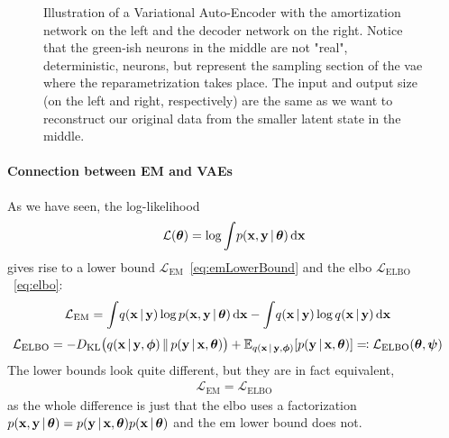 	\begin{figure}
		\centering
		\tikzVariationalAutoEncoder
		\caption{Illustration of a Variational Auto-Encoder with the amortization network on the left and the decoder network on the right. Notice that the green-ish neurons in the middle are not "real", deterministic, neurons, but represent the sampling section of the \ac{vae} where the reparametrization takes place. The input and output size (on the left and right, respectively) are the same as we want to reconstruct our original data from the smaller latent state in the middle.}
		\label{fig:vae}
	\end{figure}

	\paragraph{Connection between EM and VAEs}
		As we have seen, the log-likelihood
		\begin{align*}
			\mathcal{L}(\boldsymbol{\mathrm{\theta}}) = \log \int\! p(\boldsymbol{\mathrm{x}}, \boldsymbol{\mathrm{y}} \,\vert\, \boldsymbol{\mathrm{\theta}}) \dd{\boldsymbol{\mathrm{x}}}
		\end{align*}
		gives rise to a lower bound \( \mathcal{L}_\mathrm{EM} \)~\eqref{eq:emLowerBound} and the \ac{elbo} \( \mathcal{L}_\mathrm{ELBO} \)~\eqref{eq:elbo}:
		\begin{align*}
			\mathcal{L}_\mathrm{EM}
				&= \int\! q(\boldsymbol{\mathrm{x}} \,\vert\, \boldsymbol{\mathrm{y}}) \log p(\boldsymbol{\mathrm{x}}, \boldsymbol{\mathrm{y}} \,\vert\, \boldsymbol{\mathrm{\theta}}) \dd{\boldsymbol{\mathrm{x}}} - \int\! q(\boldsymbol{\mathrm{x}} \,\vert\, \boldsymbol{\mathrm{y}}) \log q(\boldsymbol{\mathrm{x}} \,\vert\, \boldsymbol{\mathrm{y}}) \dd{\boldsymbol{\mathrm{x}}}
		\end{align*}
		\begin{align*}
			\mathcal{L}_\mathrm{ELBO}
				&= -D_\mathrm{KL}\big( q(\boldsymbol{\mathrm{x}} \,\vert\, \boldsymbol{\mathrm{y}}, \boldsymbol{\mathrm{\phi}}) \,\Vert\, p(\boldsymbol{\mathrm{y}} \,\vert\, \boldsymbol{\mathrm{x}}, \boldsymbol{\mathrm{\theta}}) \big) + \mathbb{E}_{q(\boldsymbol{\mathrm{x}} \,\vert\, \boldsymbol{\mathrm{y}}, \boldsymbol{\mathrm{\phi}})}[p(\boldsymbol{\mathrm{y}} \,\vert\, \boldsymbol{\mathrm{x}}, \boldsymbol{\mathrm{\theta}})] \eqqcolon \mathcal{L}_\mathrm{ELBO}(\boldsymbol{\mathrm{\theta}}, \boldsymbol{\mathrm{\psi}})
		\end{align*}
		The lower bounds look quite different, but they are in fact equivalent,
		\begin{align*}
			\mathcal{L}_\mathrm{EM} = \mathcal{L}_\mathrm{ELBO}
		\end{align*}
		as the whole difference is just that the \ac{elbo} uses a factorization \( p(\boldsymbol{\mathrm{x}}, \boldsymbol{\mathrm{y}} \,\vert\, \boldsymbol{\mathrm{\theta}}) = p(\boldsymbol{\mathrm{y}} \,\vert\, \boldsymbol{\mathrm{x}}, \boldsymbol{\mathrm{\theta}}) p(\boldsymbol{\mathrm{x}} \,\vert\, \boldsymbol{\mathrm{\theta}}) \) and the \ac{em} lower bound does not.

